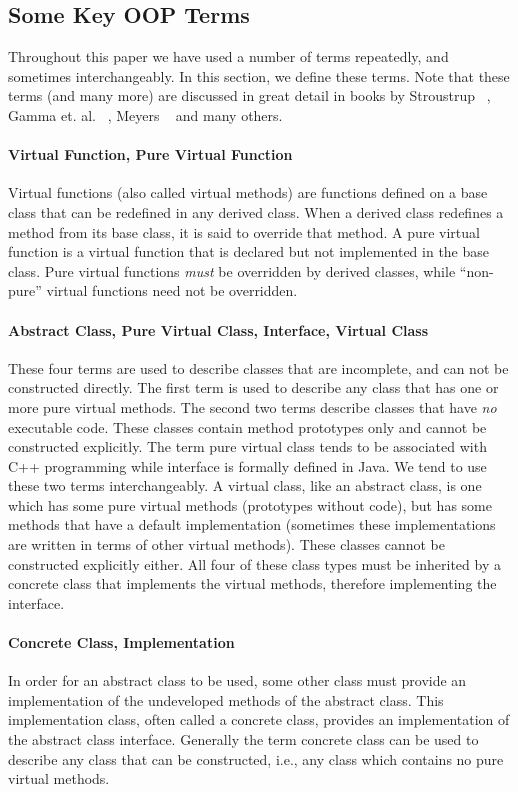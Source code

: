 \documentclass[12pt,relax]{TrilinosOverview}
\begin{document}
\subsection{Some Key OOP Terms}
Throughout this paper we have used a number of terms repeatedly, and sometimes
interchangeably. In this section, we define these terms. Note that these terms
(and many more) are discussed in great detail in books by
Stroustrup ~\cite{Stroustrup}, Gamma et. al. ~\cite{Gamma},
Meyers ~\cite{Meyers1,Meyers2} and many others.

\paragraph{Virtual Function, Pure Virtual Function}
Virtual functions (also called virtual methods) are functions defined on a
base class that can be redefined in any derived class. When a derived class
redefines a method from its base class, it is said to override that method.
A pure virtual function is a virtual function that is declared but not
implemented in the base class. Pure virtual functions {\it must} be overridden
by derived classes, while ``non-pure'' virtual functions need not be overridden.

\paragraph{Abstract Class, Pure Virtual Class, Interface, Virtual Class}  
These four terms are used to describe classes that are incomplete, and can not
be constructed directly.  The first term is used to describe any class that has
one or more pure virtual methods.  The second two terms describe classes that
have {\it no} executable code.  These classes contain method prototypes only
and cannot be constructed explicitly.  The term pure virtual class tends to be
associated with C++ programming while interface is formally defined in Java.
We tend to use these two terms interchangeably.  A virtual class, like an
abstract class, is one which has some pure virtual methods (prototypes without
code), but has some methods that have a default implementation (sometimes these
implementations are written in terms of other virtual methods).  These
classes cannot be constructed explicitly either.  All four of these class types
must be inherited by a concrete class that implements the virtual
methods, therefore implementing the interface.

\paragraph{Concrete Class, Implementation}  In order for an abstract class to
be used, some other class must provide an implementation of the undeveloped
methods of the abstract class. This implementation class, often called a
concrete class, provides an implementation of the abstract class interface.
Generally the term concrete class can be used to describe any class that can
be constructed, i.e., any class which contains no pure virtual methods.
\end{document}
